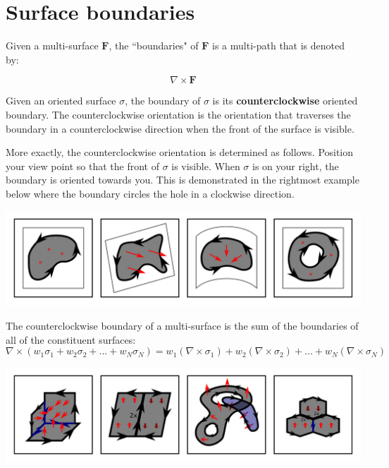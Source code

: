 \documentclass{book}
\begin{document}
\section{Surface boundaries}

Given a multi-surface \(\mathbf{F}\), the ``boundaries" of \(\mathbf{F}\) is a multi-path that is denoted by: 

\[\nabla \times \mathbf{F}\]

Given an oriented surface \(\sigma\), the boundary of \(\sigma\) is its {\bf counterclockwise} oriented boundary. The counterclockwise orientation is the orientation that traverses the boundary in a counterclockwise direction when the front of the surface is visible. 

More exactly, the counterclockwise orientation is determined as follows. Position your view point so that the front of \(\sigma\) is visible. When \(\sigma\) is on your right, the boundary is oriented towards you. This is demonstrated in the rightmost example below where the boundary circles the hole in a clockwise direction.

\begin{center}
\includegraphics[width = \textwidth]{Boundaries/Surface_boundaries/surface_boundary_examples}
\end{center}

The counterclockwise boundary of a multi-surface is the sum of the boundaries of all of the constituent surfaces:
\[\nabla \times (w_1 \sigma_1 + w_2 \sigma_2 + ... + w_N \sigma_N)
= w_1(\nabla \times \sigma_1) + w_2(\nabla \times \sigma_2) + ... + w_N(\nabla \times \sigma_N)\]

\begin{center}
\includegraphics[width = \textwidth]{Boundaries/Surface_boundaries/surface_boundary_examples_2}
\end{center}
\end{document}
